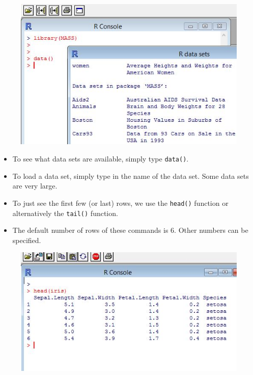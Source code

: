 \documentclass{beamer}
\begin{document}
 	\begin{frame}
 		\begin{figure}
 			\centering
 			\includegraphics[width=1.2\linewidth]{images/RdatasetsMore}   
 		\end{figure}
 	\end{frame}   
 	\begin{frame}
 		
 		\begin{itemize}
 			\item To see what data sets are available, simply type \texttt{data()}.
 			\item  To load a data set, simply type in the
 			name of the data set. Some data sets are very large.
 			\item  To just see the first few (or last) rows, we
 			use the \texttt{head()} function or alternatively the \texttt{tail()} function. 
 			\item The default number of rows of
 			these commands is 6. Other numbers can be specified.
 		\end{itemize}
 		
 	\end{frame}
 	\begin{frame}
 		\begin{figure}
 			\centering 
 			\includegraphics[width=1.2\linewidth]{images/irishead}      
 		\end{figure}
 	\end{frame}   
\end{document}
